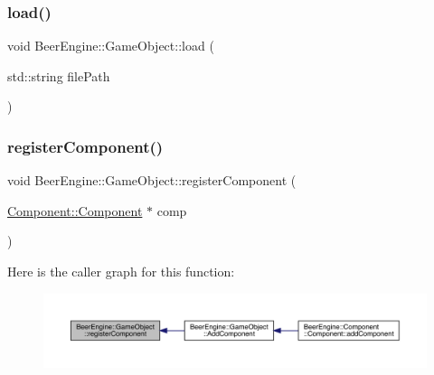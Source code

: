 \subsubsection{\texorpdfstring{load()}{load()}}
{\footnotesize\ttfamily void Beer\+Engine\+::\+Game\+Object\+::load (\begin{DoxyParamCaption}\item[{std\+::string}]{file\+Path }\end{DoxyParamCaption})}

\mbox{\label{class_beer_engine_1_1_game_object_a1454d7ec7fc8d98d621ae9be166976e4}} 
\subsubsection{\texorpdfstring{register\+Component()}{registerComponent()}}
{\footnotesize\ttfamily void Beer\+Engine\+::\+Game\+Object\+::register\+Component (\begin{DoxyParamCaption}\item[{\mbox{\hyperlink{class_beer_engine_1_1_component_1_1_component}{Component\+::\+Component}} $\ast$}]{comp }\end{DoxyParamCaption})\hspace{0.3cm}{\ttfamily [inline]}}

Here is the caller graph for this function\+:\nopagebreak
\begin{figure}[H]
\begin{center}
\leavevmode
\includegraphics[width=350pt]{class_beer_engine_1_1_game_object_a1454d7ec7fc8d98d621ae9be166976e4_icgraph}
\end{center}
\end{figure}
\mbox{\label{class_beer_engine_1_1_game_object_ac74ff77a1e62e76eff1247c4d3daaa33}} 
